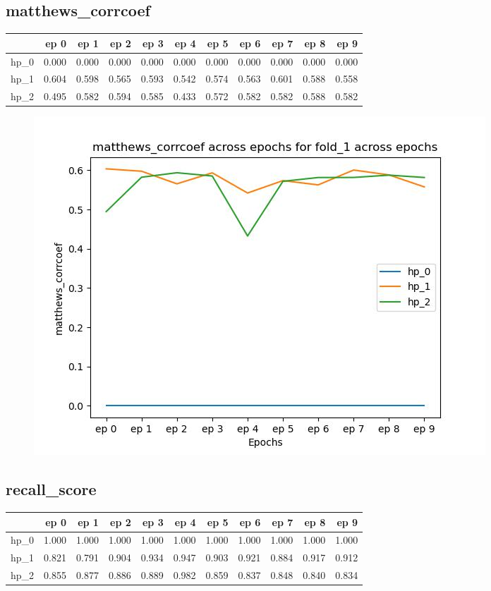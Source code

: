 \documentclass{article}
\begin{document}
\subsection{matthews\_corrcoef}
\begin{tabular}{lrrrrrrrrrr}
\toprule
{} &   ep 0 &   ep 1 &   ep 2 &   ep 3 &   ep 4 &   ep 5 &   ep 6 &   ep 7 &   ep 8 &   ep 9 \\
\midrule
hp\_0 &  0.000 &  0.000 &  0.000 &  0.000 &  0.000 &  0.000 &  0.000 &  0.000 &  0.000 &  0.000 \\
hp\_1 &  0.604 &  0.598 &  0.565 &  0.593 &  0.542 &  0.574 &  0.563 &  0.601 &  0.588 &  0.558 \\
hp\_2 &  0.495 &  0.582 &  0.594 &  0.585 &  0.433 &  0.572 &  0.582 &  0.582 &  0.588 &  0.582 \\
\bottomrule
\end{tabular}

\begin{figure}[H]
\includegraphics[scale = 0.75]{fold_1/matthews_corrcoef}
\end{figure}
\subsection{recall\_score}
\begin{tabular}{lrrrrrrrrrr}
\toprule
{} &   ep 0 &   ep 1 &   ep 2 &   ep 3 &   ep 4 &   ep 5 &   ep 6 &   ep 7 &   ep 8 &   ep 9 \\
\midrule
hp\_0 &  1.000 &  1.000 &  1.000 &  1.000 &  1.000 &  1.000 &  1.000 &  1.000 &  1.000 &  1.000 \\
hp\_1 &  0.821 &  0.791 &  0.904 &  0.934 &  0.947 &  0.903 &  0.921 &  0.884 &  0.917 &  0.912 \\
hp\_2 &  0.855 &  0.877 &  0.886 &  0.889 &  0.982 &  0.859 &  0.837 &  0.848 &  0.840 &  0.834 \\
\bottomrule
\end{tabular}
\end{document}
